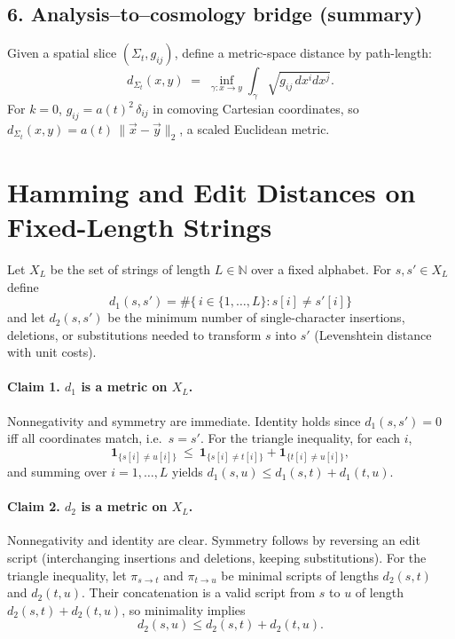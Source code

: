 \documentclass[12pt,a4paper]{article}
\begin{document}
\subsection*{6. Analysis--to--cosmology bridge (summary)}
Given a spatial slice $(\Sigma_t,g_{ij})$, define a metric-space distance by path-length:
\[
d_{\Sigma_t}(x,y) \;=\; \inf_{\gamma:x\to y} \int_\gamma \sqrt{g_{ij}\,dx^i dx^j}.
\]
For $k=0$, $g_{ij}=a(t)^2\,\delta_{ij}$ in comoving Cartesian coordinates, so
$d_{\Sigma_t}(x,y)=a(t)\,\|\vec x-\vec y\|_2$, a scaled Euclidean metric.

\section*{Hamming and Edit Distances on Fixed-Length Strings}

Let $X_L$ be the set of strings of length $L\in\mathbb{N}$ over a fixed alphabet. For $s,s'\in X_L$ define
\[
d_1(s,s')=\#\{\,i\in\{1,\dots,L\}: s[i]\ne s'[i]\}
\]
and let $d_2(s,s')$ be the minimum number of single-character insertions, deletions, or substitutions needed to transform $s$ into $s'$ (Levenshtein distance with unit costs).

\paragraph{Claim 1. $d_1$ is a metric on $X_L$.}
Nonnegativity and symmetry are immediate. Identity holds since $d_1(s,s')=0$ iff all coordinates match, i.e.\ $s=s'$.
For the triangle inequality, for each $i$,
\[
\mathbf 1_{\{s[i]\ne u[i]\}}
\ \le\
\mathbf 1_{\{s[i]\ne t[i]\}}+\mathbf 1_{\{t[i]\ne u[i]\}},
\]
and summing over $i=1,\dots,L$ yields $d_1(s,u)\le d_1(s,t)+d_1(t,u)$.

\paragraph{Claim 2. $d_2$ is a metric on $X_L$.}
Nonnegativity and identity are clear. Symmetry follows by reversing an edit script (interchanging insertions and deletions, keeping substitutions).
For the triangle inequality, let $\pi_{s\to t}$ and $\pi_{t\to u}$ be minimal scripts of lengths $d_2(s,t)$ and $d_2(t,u)$. Their concatenation is a valid script from $s$ to $u$ of length $d_2(s,t)+d_2(t,u)$, so minimality implies
\[
d_2(s,u)\le d_2(s,t)+d_2(t,u).
\]
\end{document}
